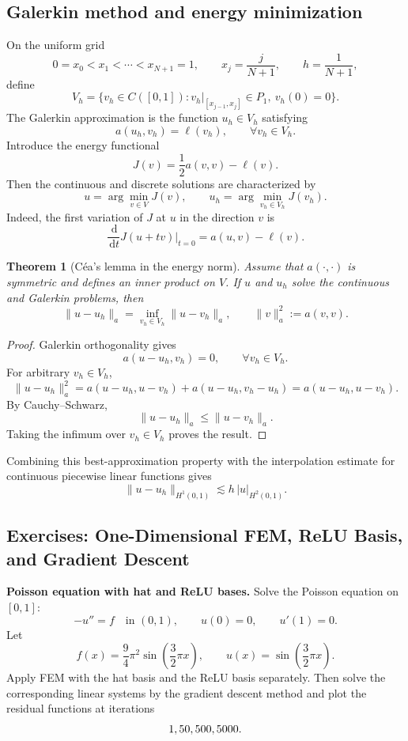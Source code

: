 \documentclass[11pt,a4paper]{article}
\newcommand{\dd}{\,\mathrm{d}}
\theoremstyle{definition}
\theoremstyle{plain}
\newtheorem{theorem}{Theorem}[section]
\theoremstyle{remark}
\theoremstyle{plain}
\begin{document}
\subsection{Galerkin method and energy minimization}
On the uniform grid
\[
  0=x_0<x_1<\cdots<x_{N+1}=1,
  \qquad
  x_j=\frac{j}{N+1},
  \qquad
  h=\frac{1}{N+1},
\]
define
\[
  V_h=\{v_h\in C([0,1]):v_h|_{[x_{j-1},x_j]}\in P_1,
  \ v_h(0)=0\}.
\]
The Galerkin approximation is the function $u_h\in V_h$ satisfying
\[
  a(u_h,v_h)=\ell(v_h),\qquad \forall v_h\in V_h.
\]
Introduce the energy functional
\[
  J(v)=\frac12a(v,v)-\ell(v).
\]
Then the continuous and discrete solutions are characterized by
\[
  u=\arg\min_{v\in V}J(v),
  \qquad
  u_h=\arg\min_{v_h\in V_h}J(v_h).
\]
Indeed, the first variation of $J$ at $u$ in the direction $v$ is
\[
  \frac{\dd}{\dd t}J(u+tv)\bigg|_{t=0}=a(u,v)-\ell(v).
\]

\begin{theorem}[C\'ea's lemma in the energy norm]
Assume that $a(\cdot,\cdot)$ is symmetric and defines an inner product on $V$. If $u$ and $u_h$ solve the continuous and Galerkin problems, then
\[
  \|u-u_h\|_a
  =\inf_{v_h\in V_h}\|u-v_h\|_a,
  \qquad
  \|v\|_a^2:=a(v,v).
\]
\end{theorem}

\begin{proof}
Galerkin orthogonality gives
\[
  a(u-u_h,v_h)=0,\qquad \forall v_h\in V_h.
\]
For arbitrary $v_h\in V_h$,
\[
  \|u-u_h\|_a^2
  =a(u-u_h,u-v_h)+a(u-u_h,v_h-u_h)
  =a(u-u_h,u-v_h).
\]
By Cauchy--Schwarz,
\[
  \|u-u_h\|_a\le \|u-v_h\|_a.
\]
Taking the infimum over $v_h\in V_h$ proves the result.
\end{proof}

Combining this best-approximation property with the interpolation estimate for continuous piecewise linear functions gives
\[
  \|u-u_h\|_{H^1(0,1)}\lesssim h\,|u|_{H^2(0,1)}.
\]

\subsection*{Exercises: One-Dimensional FEM, ReLU Basis, and Gradient Descent}
  \textbf{Poisson equation with hat and ReLU bases.}
  Solve the Poisson equation on $[0,1]$:
  \[
    -u''=f\quad\text{in }(0,1),
    \qquad u(0)=0,
    \qquad u'(1)=0.
  \]
  Let
  \[
    f(x)=\frac94\pi^2\sin\left(\frac32\pi x\right),
    \qquad
    u(x)=\sin\left(\frac32\pi x\right).
  \]
  Apply FEM with the hat basis and the ReLU basis separately. Then solve the corresponding linear systems by the gradient descent method and plot the residual functions at iterations
  \[
    1,\\ 50,\\ 500,\\ 5000.
  \]
\end{document}

